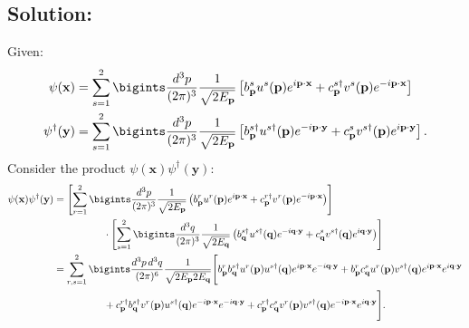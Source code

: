{\subsection*{Solution:}
Given:
   \begin{align}
       \psi(\mathbf{x}) &= \sum_{s=1}^2 \bigints\frac{d^3p}{(2\pi)^3} \frac{1}{\sqrt{2E_{\mathbf{p}}}} \left[ b^s_{\mathbf{p}} u^s(\mathbf{p}) e^{i \mathbf{p} \cdot \mathbf{x}} + c^{s\dagger}_{\mathbf{p}} v^s(\mathbf{p}) e^{-i \mathbf{p} \cdot \mathbf{x}} \right]\\
       \psi^\dagger(\mathbf{y}) &= \sum_{s=1}^2 \bigints\frac{d^3p}{(2\pi)^3} \frac{1}{\sqrt{2E_{\mathbf{p}}}} \left[ b^{s\dagger}_{\mathbf{p}} u^{s\dagger}(\mathbf{p}) e^{-i \mathbf{p} \cdot \mathbf{y}} + c^s_{\mathbf{p}} v^{s\dagger}(\mathbf{p}) e^{i \mathbf{p} \cdot \mathbf{y}} \right].
   \end{align}
   Consider the product $\psi(\mathbf{x}) \psi^\dagger(\mathbf{y})$:
   \begin{align*}
       \psi(\mathbf{x}) \psi^\dagger(\mathbf{y}) &= \left[ \sum_{r=1}^2 \bigints\frac{d^3p}{(2\pi)^3} \frac{1}{\sqrt{2E_{\mathbf{p}}}} \left( b^r_{\mathbf{p}} u^r(\mathbf{p}) e^{i \mathbf{p} \cdot \mathbf{x}} + c^{r\dagger}_{\mathbf{p}} v^r(\mathbf{p}) e^{-i \mathbf{p} \cdot \mathbf{x}} \right) \right] \\
       &\hspace{50pt}\cdot\left[ \sum_{s=1}^2 \bigints\frac{d^3q}{(2\pi)^3} \frac{1}{\sqrt{2E_{\mathbf{q}}}} \left( b^{s\dagger}_{\mathbf{q}} u^{s\dagger}(\mathbf{q}) e^{-i \mathbf{q} \cdot \mathbf{y}} + c^s_{\mathbf{q}} v^{s\dagger}(\mathbf{q}) e^{i \mathbf{q} \cdot \mathbf{y}} \right) \right]\notag\\
       &= \sum_{r,s=1}^2 \bigints\frac{d^3p \, d^3q}{(2\pi)^6} \frac{1}{\sqrt{2E_{\mathbf{p}} 2E_{\mathbf{q}}}} \Bigg[ b^r_{\mathbf{p}} b^{s\dagger}_{\mathbf{q}} u^r(\mathbf{p}) u^{s\dagger}(\mathbf{q}) e^{i \mathbf{p} \cdot \mathbf{x}} e^{-i \mathbf{q} \cdot \mathbf{y}} + b^r_{\mathbf{p}} c^s_{\mathbf{q}} u^r(\mathbf{p}) v^{s\dagger}(\mathbf{q}) e^{i \mathbf{p} \cdot \mathbf{x}} e^{i \mathbf{q} \cdot \mathbf{y}} \\
       &\hspace{50pt} + c^{r\dagger}_{\mathbf{p}} b^{s\dagger}_{\mathbf{q}} v^r(\mathbf{p}) u^{s\dagger}(\mathbf{q}) e^{-i \mathbf{p} \cdot \mathbf{x}} e^{-i \mathbf{q} \cdot \mathbf{y}} + c^{r\dagger}_{\mathbf{p}} c^s_{\mathbf{q}} v^r(\mathbf{p}) v^{s\dagger}(\mathbf{q}) e^{-i \mathbf{p} \cdot \mathbf{x}} e^{i \mathbf{q} \cdot \mathbf{y}} \Bigg].

\end{align*}}
